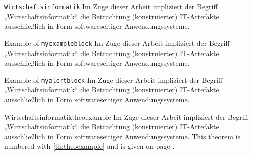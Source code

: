 \noindent{}

\begin{myblock}{ \texttt{Wirtschaftsinformatik}}
Im Zuge dieser Arbeit impliziert der Begriff „Wirtschaftsinformatik“ die Betrachtung (konstruierter) IT-Artefakte ausschließlich in Form softwareseitiger Anwendungssysteme.
\end{myblock}

\begin{myexampleblock}{Example of \texttt{myexampleblock}}
Im Zuge dieser Arbeit impliziert der Begriff „Wirtschaftsinformatik“ die Betrachtung (konstruierter) IT-Artefakte ausschließlich in Form softwareseitiger Anwendungssysteme.
\end{myexampleblock}

\begin{myalertblock}{Example of \texttt{myalertblock}}
Im Zuge dieser Arbeit impliziert der Begriff „Wirtschaftsinformatik“ die Betrachtung (konstruierter) IT-Artefakte ausschließlich in Form softwareseitiger Anwendungssysteme.
\end{myalertblock}


\begin{mydef}{Wirtschaftsinformatik}{theoexample}
  Im Zuge dieser Arbeit impliziert der Begriff „Wirtschaftsinformatik“ die Betrachtung (konstruierter) IT-Artefakte ausschließlich in Form softwareseitiger Anwendungssysteme.
  This theorem is numbered with  \ref{th:theoexample} and is given on page \pageref{th:theoexample}.
\tcbuselistingtext
\tcbuselistingtext
\end{mydef}